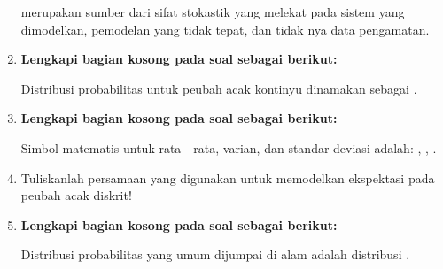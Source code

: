 \begin{enumerate}
    \underline{\hspace{3cm}} merupakan sumber dari sifat stokastik yang melekat pada sistem yang dimodelkan, pemodelan yang tidak tepat, dan tidak nya data pengamatan.
    
    \item \textbf{Lengkapi bagian kosong pada soal sebagai berikut: }
    
    Distribusi probabilitas untuk peubah acak kontinyu dinamakan sebagai \underline{\hspace{3cm}}.
    
    \item \textbf{Lengkapi bagian kosong pada soal sebagai berikut: }
    
    Simbol matematis untuk rata - rata, varian, dan standar deviasi adalah: \underline{\hspace{1cm}}, \underline{\hspace{1cm}}, \underline{\hspace{1cm}}.
    
    \item Tuliskanlah persamaan yang digunakan untuk memodelkan ekspektasi pada peubah acak diskrit!
    
    \item \textbf{Lengkapi bagian kosong pada soal sebagai berikut: }
    
    Distribusi probabilitas yang umum dijumpai di alam adalah distribusi \underline{\hspace{3cm}}.
\end{enumerate}

